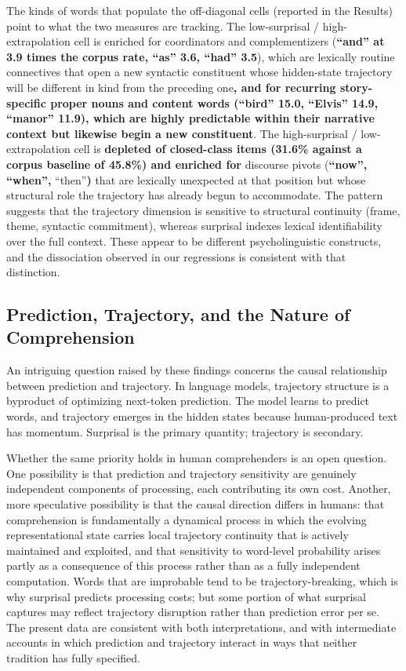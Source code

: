 \documentclass[12pt]{article}
\newcommand{\new}[1]{{\bfseries #1}}
\begin{document}
The kinds of words that populate the off-diagonal cells (reported in the Results) point to what the two measures are tracking. The low-surprisal / high-extrapolation cell is enriched for coordinators and complementizers (\new{``and'' at 3.9 times the corpus rate, ``as'' 3.6, ``had'' 3.5}), which are lexically routine connectives that open a new syntactic constituent whose hidden-state trajectory will be different in kind from the preceding one\new{, and for recurring story-specific proper nouns and content words (``bird'' 15.0, ``Elvis'' 14.9, ``manor'' 11.9), which are highly predictable within their narrative context but likewise begin a new constituent}. The high-surprisal / low-extrapolation cell is \new{depleted of closed-class items (31.6\% against a corpus baseline of 45.8\%) and enriched for} discourse pivots (\new{``now'', ``when'',} ``then''\new{)} that are lexically unexpected at that position but whose structural role the trajectory has already begun to accommodate. The pattern suggests that the trajectory dimension is sensitive to structural continuity (frame, theme, syntactic commitment), whereas surprisal indexes lexical identifiability over the full context. These appear to be different psycholinguistic constructs, and the dissociation observed in our regressions is consistent with that distinction.

\subsection{Prediction, Trajectory, and the Nature of Comprehension}

An intriguing question raised by these findings concerns the causal relationship between prediction and trajectory. In language models, trajectory structure is a byproduct of optimizing next-token prediction. The model learns to predict words, and trajectory emerges in the hidden states because human-produced text has momentum. Surprisal is the primary quantity; trajectory is secondary.

Whether the same priority holds in human comprehenders is an open question. One possibility is that prediction and trajectory sensitivity are genuinely independent components of processing, each contributing its own cost. Another, more speculative possibility is that the causal direction differs in humans: that comprehension is fundamentally a dynamical process in which the evolving representational state carries local trajectory continuity that is actively maintained and exploited, and that sensitivity to word-level probability arises partly as a consequence of this process rather than as a fully independent computation. Words that are improbable tend to be trajectory-breaking, which is why surprisal predicts processing costs; but some portion of what surprisal captures may reflect trajectory disruption rather than prediction error per se. The present data are consistent with both interpretations, and with intermediate accounts in which prediction and trajectory interact in ways that neither tradition has fully specified.
\end{document}
